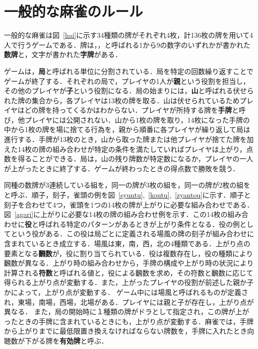 \section{一般的な麻雀のルール}
一般的な麻雀は図~\ref{hai}に示す34種類の牌がそれぞれ4枚，計136枚の牌を用いて4人で行うゲームである．牌は\textbf{}，\textbf{}，\textbf{}と呼ばれる1から9の数字のいずれかが書かれた\textbf{数牌}と，文字が書かれた\textbf{字牌}がある．

ゲームは，\textbf{局}と呼ばれる単位に分割されている．局を特定の回数繰り返すことでゲームが終了する．それぞれの局で，プレイヤの1人が\textbf{親}という役割を担当し，その他のプレイヤが\textbf{子}という役割になる．局の始まりには，\textbf{山}と呼ばれる伏せられた牌の集合から，各プレイヤは13枚の牌を取る．山は伏せられているためプレイヤはどの牌を持ってくるかはわからない．プレイヤが所持する牌を\textbf{手牌}と呼び，他プレイヤには公開されない．山から1枚の牌を取り，14枚になった手牌の中から1枚の牌を場に捨てる行為を，親から順番に各プレイヤが繰り返して局は進行する．手牌が13枚のとき，山から取った牌または他プレイヤが捨てた牌を加えた14枚の牌の組み合わせが特定の条件を満たしていればプレイヤは上がり，点数を得ることができる．局は，山の残り牌数が特定数になるか，プレイヤの一人が上がったときに終了する．ゲームが終わったときの得点数で勝敗を競う．

同種の数牌が3連続している組を\textbf{}，同一の牌が3枚の組を\textbf{}，同一の牌が2枚の組を\textbf{}と呼ぶ．順子，刻子，雀頭の例を図~\ref{syuntu},~\ref{koutu},~\ref{zyantou}に示す．順子と刻子を合わせて4つ，雀頭を1つの14枚の牌が上がりに必要な組み合わせである．図~\ref{agari}に上がりに必要な14枚の牌の組み合わせ例を示す．この14枚の組み合わせに\textbf{役}と呼ばれる特定のパターンがあるときが上がり条件となる．役の例として\textbf{}という役がある．この役は局ごとに定義される場風の牌の刻子が組み合わせに含まれているとき成立する．場風は東，南，西，北の4種類である．上がり点の要素となる\textbf{飜数}が，役に割り当てられている．役は複数存在し，役の種類により飜数が異なる．上がり時の組み合わせから，手牌の構成や上がり時の状況により計算される\textbf{符数}と呼ばれる値と，役による飜数を求め，その符数と飜数に応じて得られる上がり点が変動する．また，上がったプレイヤの役割が前述した親か子かによって，上がり点が変動する．
 ゲーム中には場風と呼ばれるものが定義され，東場，南場，西場，北場がある．プレイヤには親と子が存在し，上がり点が異なる．\fi 
また，局の開始時に１種類の牌がドラとして指定され，この牌が上がったときの手牌に含まれているときにも，上がり点が変動する．麻雀では，手牌から上がりまでに最低限置き換えなければならない牌数を\textbf{}，手牌に入れたとき向聴数が下がる牌を\textbf{有効牌}と呼ぶ．

